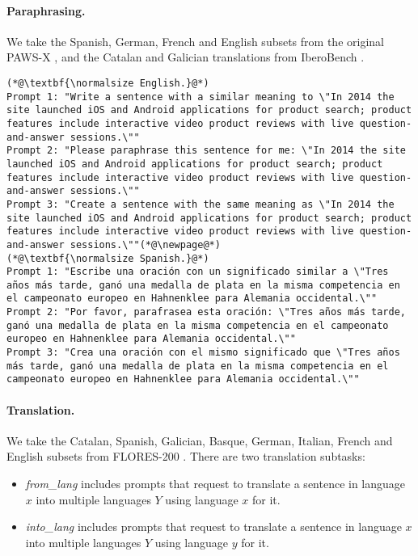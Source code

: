 \paragraph{Paraphrasing.} We take the Spanish, German, French and English subsets from the original PAWS-X \citep{yang-etal-2019-paws}, and the Catalan and Galician translations from IberoBench \citep{iberobench-coling-2025}.

\begin{lstlisting}[label=lst:judge_paraphr_instances,caption={Example of prompts for paraphrasing in English and Spanish.}]
(*@\textbf{\normalsize English.}@*)
Prompt 1: "Write a sentence with a similar meaning to \"In 2014 the site launched iOS and Android applications for product search; product features include interactive video product reviews with live question-and-answer sessions.\""
Prompt 2: "Please paraphrase this sentence for me: \"In 2014 the site launched iOS and Android applications for product search; product features include interactive video product reviews with live question-and-answer sessions.\""
Prompt 3: "Create a sentence with the same meaning as \"In 2014 the site launched iOS and Android applications for product search; product features include interactive video product reviews with live question-and-answer sessions.\""(*@\newpage@*)
(*@\textbf{\normalsize Spanish.}@*)
Prompt 1: "Escribe una oración con un significado similar a \"Tres años más tarde, ganó una medalla de plata en la misma competencia en el campeonato europeo en Hahnenklee para Alemania occidental.\""
Prompt 2: "Por favor, parafrasea esta oración: \"Tres años más tarde, ganó una medalla de plata en la misma competencia en el campeonato europeo en Hahnenklee para Alemania occidental.\""
Prompt 3: "Crea una oración con el mismo significado que \"Tres años más tarde, ganó una medalla de plata en la misma competencia en el campeonato europeo en Hahnenklee para Alemania occidental.\""
\end{lstlisting}

\paragraph{Translation.} We take the Catalan, Spanish, Galician, Basque, German, Italian, French and English subsets from FLORES-200 \citep{nllbteam2022language}. There are two translation subtasks:
\begin{itemize}
    \item \emph{from\_lang} includes prompts that request to translate a sentence in language $x$ into multiple languages $Y$ using language $x$ for it.
    \item \emph{into\_lang} includes prompts that request to translate a sentence in language $x$ into multiple languages $Y$ using language $y$ for it.
\end{itemize}

